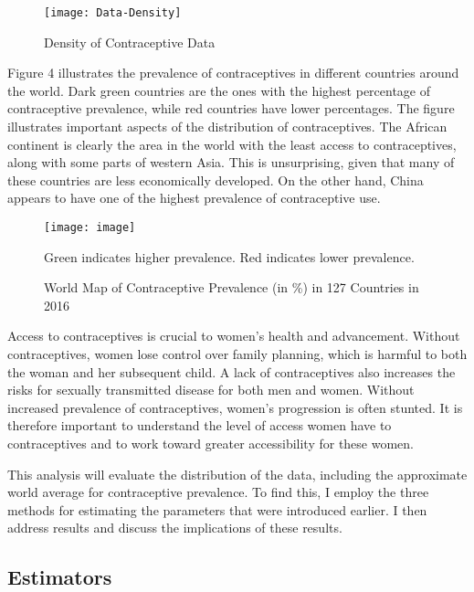 \documentclass{svproc}
\begin{document}
\begin{figure}[H]
\begin{center}
\texttt{[image: Data-Density]}
\label{plot3}
\smallskip
\caption{Density of Contraceptive Data}
\end{center}
\end{figure}

Figure 4 illustrates the prevalence of contraceptives in different countries around the world. Dark green countries are the ones with the highest percentage of contraceptive prevalence, while red countries have lower percentages. The figure illustrates important aspects of the distribution of contraceptives. The African continent is clearly the area in the world with the least access to contraceptives, along with some parts of western Asia. This is unsurprising, given that many of these countries are less economically developed. On the other hand, China appears to have one of the highest prevalence of contraceptive use. 

\begin{figure}[H]
\begin{center}
\texttt{[image: image]}
\label{plot4}
\caption{World Map of Contraceptive Prevalence (in \%) in 127 Countries in 2016}
\medskip
\small
Green indicates higher prevalence. Red indicates lower prevalence.
\end{center}
\end{figure}

Access to contraceptives is crucial to women's health and advancement. Without contraceptives, women lose control over family planning, which is harmful to both the woman and her subsequent child. A lack of contraceptives also increases the risks for sexually transmitted disease for both men and women. Without increased prevalence of contraceptives, women's progression is often stunted. It is therefore important to understand the level of access women have to contraceptives and to work toward greater accessibility for these women.

This analysis will evaluate the distribution of the data, including the approximate world average for contraceptive prevalence. To find this, I employ the three methods for estimating the parameters that were introduced earlier. I then address results and discuss the implications of these results.

\subsection{Estimators}
\end{document}
